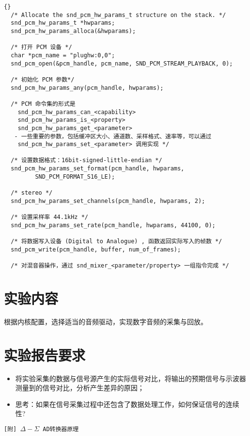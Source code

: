 \lstset{language=c}
\begin{lstlisting}{}
  /* Allocate the snd_pcm_hw_params_t structure on the stack. */
  snd_pcm_hw_params_t *hwparams;
  snd_pcm_hw_params_alloca(&hwparams);
  
  /* 打开 PCM 设备 */
  char *pcm_name = "plughw:0,0";
  snd_pcm_open(&pcm_handle, pcm_name, SND_PCM_STREAM_PLAYBACK, 0);
  
  /* 初始化 PCM 参数*/
  snd_pcm_hw_params_any(pcm_handle, hwparams);
  
  /* PCM 命令集的形式是
  	snd_pcm_hw_params_can_<capability>
  	snd_pcm_hw_params_is_<property>
  	snd_pcm_hw_params_get_<parameter>
   - 一些重要的参数，包括缓冲区大小、通道数、采样格式、速率等，可以通过
  	snd_pcm_hw_params_set_<parameter> 调用实现 */
  
  /* 设置数据格式：16bit-signed-little-endian */
  snd_pcm_hw_params_set_format(pcm_handle, hwparams,
         SND_PCM_FORMAT_S16_LE);
  
  /* stereo */ 
  snd_pcm_hw_params_set_channels(pcm_handle, hwparams, 2);
  
  /* 设置采样率 44.1kHz */
  snd_pcm_hw_params_set_rate(pcm_handle, hwparams, 44100, 0);
  
  /* 将数据写入设备 (Digital to Analogue) , 函数返回实际写入的帧数 */
  snd_pcm_write(pcm_handle, buffer, num_of_frames);
  
  /* 对混音器操作，通过 snd_mixer_<parameter/property> 一组指令完成 */
\end{lstlisting}


\section{实验内容}

	根据内核配置，选择适当的音频驱动，实现数字音频的采集与回放。

\section{实验报告要求}
\begin{itemize}\itemsep=-3pt
  \item 将实验采集的数据与信号源产生的实际信号对比，将输出的预期信号与示波器
		测量到的信号对比，分析产生差异的原因；
  \item 思考：如果在信号采集过程中还包含了数据处理工作，如何保证信号的连续性?
\end{itemize}

\newpage
\tt [附] $\Delta-\Sigma$ AD转换器原理


